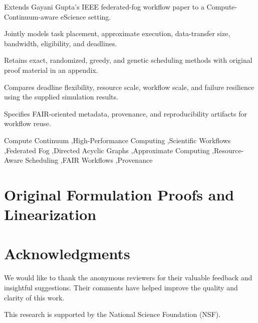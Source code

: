 \documentclass[a4paper,fleqn]{cas-dc}
\begin{document}
\begin{highlights}
\item Extends Gayani Gupta's IEEE federated-fog workflow paper to a Compute-Continuum-aware eScience setting.
\item Jointly models task placement, approximate execution, data-transfer size, bandwidth, eligibility, and deadlines.
\item Retains exact, randomized, greedy, and genetic scheduling methods with original proof material in an appendix.
\item Compares deadline flexibility, resource scale, workflow scale, and failure resilience using the supplied simulation results.
\item Specifies FAIR-oriented metadata, provenance, and reproducibility artifacts for workflow reuse.
\end{highlights}

\begin{keywords}
Compute Continuum \sep High-Performance Computing \sep Scientific Workflows \sep Federated Fog \sep Directed Acyclic Graphs \sep Approximate Computing \sep Resource-Aware Scheduling \sep FAIR Workflows \sep Provenance
\end{keywords}

\maketitle











\appendix
\section{Original Formulation Proofs and Linearization}
\label{app:original_proofs}


\section*{Acknowledgments}
We would like to thank the anonymous reviewers for their valuable feedback and insightful suggestions. Their comments have helped improve the quality and clarity of this work.

This research is supported by the National Science Foundation (NSF).

\printcredits
\balance


\end{document}
